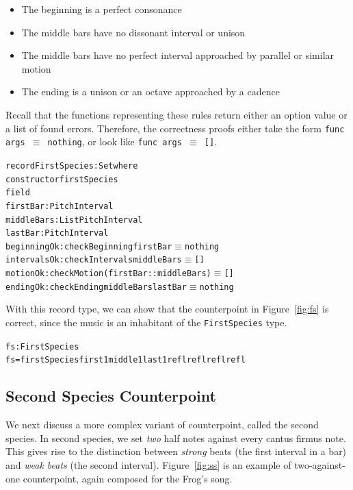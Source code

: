 \begin{itemize}
  \item The beginning is a perfect consonance
  \item The middle bars have no dissonant interval or unison
  \item The middle bars have no perfect interval approached by
    parallel or similar motion
  \item The ending is a unison or an octave approached by a cadence
\end{itemize}

\noindent Recall that the functions representing these rules return
either an option value or a list of found errors.
Therefore, the correctness proofs either take the form
\texttt{func args $\equiv$ nothing}, or look like
\texttt{func args $\equiv$ []}.

\begin{alltt}
record FirstSpecies : Set where
  constructor firstSpecies
  field
    firstBar    : PitchInterval
    middleBars  : List PitchInterval
    lastBar     : PitchInterval
    beginningOk : checkBeginning firstBar \(\equiv\) nothing
    intervalsOk : checkIntervals middleBars \(\equiv\) []
    motionOk    : checkMotion (firstBar :: middleBars) \(\equiv\) []
    endingOk    : checkEnding middleBars lastBar \(\equiv\) nothing
\end{alltt}

With this record type, we can show that the counterpoint in
Figure~\ref{fig:fs} is correct, since the music is an inhabitant of
the \texttt{FirstSpecies} type.

\begin{alltt}
fs : FirstSpecies
fs = firstSpecies first1 middle1 last1 refl refl refl refl
\end{alltt}

\subsection{Second Species Counterpoint}
\label{sec:cp:ss}

\SS

We next discuss a more complex variant of counterpoint, called the
second species.
In second species, we set \emph{two} half notes against every cantus
firmus note.
This gives rise to the distinction between \emph{strong} beats (the
first interval in a bar) and \emph{weak beats} (the second interval).
Figure~\ref{fig:ss} is an example of two-against-one counterpoint,
again composed for the Frog's song.

